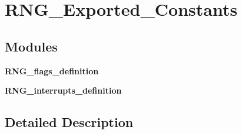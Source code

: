 \section{R\+N\+G\+\_\+\+Exported\+\_\+\+Constants}
\label{group__RNG__Exported__Constants}
\subsection*{Modules}
\begin{DoxyCompactItemize}
\item 
\textbf{ R\+N\+G\+\_\+flags\+\_\+definition}
\item 
\textbf{ R\+N\+G\+\_\+interrupts\+\_\+definition}
\end{DoxyCompactItemize}


\subsection{Detailed Description}
